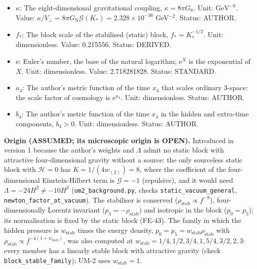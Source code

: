 \documentclass[
  10pt,
]{article}
\begin{document}
\begin{itemize}
  \(f\): The block scale: the common scale factor of the hidden
  direction and the extra times, \(f = \mathrm{e}^{-a_4}b_4^{1/2}\) (the
  block is \(f^2\) times a four-dimensional space of constant curvature
  \(-H^2\)). Unit: dimensionless. Status: DERIVED.
\item
  \(\kappa\): The eight-dimensional gravitational coupling,
  \(\kappa = 8\pi G_8\). Unit: \(\mathrm{GeV}^{-6}\). Value:
  \(\kappa/V_\perp = 8\pi G_{\mathrm{N}}\mathcal{G}(K_*) = 2.328\times10^{-36}\)
  GeV\(^{-2}\). Status: AUTHOR.
\item
  \(f_*\): The block scale of the stabilised (static) block,
  \(f_* = K_*^{-1/2}\). Unit: dimensionless. Value: 0.215556. Status:
  DERIVED.
\item
  \(\mathrm{e}\): Euler's number, the base of the natural logarithm;
  \(\mathrm{e}^{X}\) is the exponential of \(X\). Unit: dimensionless.
  Value: 2.718281828. Status: STANDARD.
\item
  \(a_4\): The author's metric function of the time \(x_4\) that scales
  ordinary 3-space: the scale factor of cosmology is
  \(\mathrm{e}^{a_4}\). Unit: dimensionless. Status: AUTHOR.
\item
  \(b_4\): The author's metric function of the time \(x_4\) in the
  hidden and extra-time components, \(b_4 > 0\). Unit: dimensionless.
  Status: AUTHOR.
\end{itemize}

\textbf{Origin (ASSUMED; its microscopic origin is OPEN).} Introduced in
version 1 because the author's weights and \(\Lambda\) admit no static
block with attractive four-dimensional gravity without a source: the
only sourceless static block with \(\mathcal{H} = 0\) has
\(K = 1/(4w_{(2)}) = 8\), where the coefficient of the four-dimensional
Einstein-Hilbert term is \(\mathcal{G} = -1\) (repulsive), and it would
need \(\Lambda = -24H^2 \ne -10H^2\) (\texttt{um2\_background.py},
checks \texttt{static\_vacuum\_general},
\texttt{newton\_factor\_at\_vacuum}). The stabiliser is conserved
(\(\rho_{\mathrm{stab}} \propto f^{-8}\)), four-dimensionally Lorentz
invariant (\(p_3 = -\rho_{\mathrm{stab}}\)) and isotropic in the block
(\(p_0 = p_5\)); its normalisation is fixed by the static block (FE-43).
The family in which the hidden pressure is \(w_{\mathrm{stab}}\) times
the energy density,
\(p_0 = p_5 = w_{\mathrm{stab}}\rho_{\mathrm{stab}}\) with
\(\rho_{\mathrm{stab}} \propto f^{-4(1 + w_{\mathrm{stab}})}\), was also
computed at \(w_{\mathrm{stab}} = 1/4, 1/2, 3/4, 1, 5/4, 3/2, 2, 3\):
every member has a linearly stable block with attractive gravity (check
\texttt{block\_stable\_family}); UM-2 uses \(w_{\mathrm{stab}} = 1\).
\end{document}
